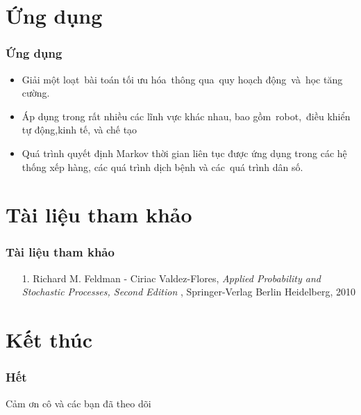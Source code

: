 \documentclass[12pt]{beamer}
\begin{document}
\section{Ứng dụng}
\begin{frame}
	\frametitle{Ứng dụng}
	\begin{itemize}
	\item
	Giải một loạt bài toán tối ưu hóa thông qua quy hoạch động và học tăng cường.
	\item
	Áp dụng trong rất nhiều các lĩnh vực khác nhau, bao gồm robot, điều khiển tự động,kinh tế, và chế tạo
	\item
	Quá trình quyết định Markov thời gian liên tục được ứng dụng trong các hệ thống xếp hàng, các quá trình dịch bệnh và các quá trình dân số.
	\end{itemize}
\end{frame}

\section*{Tài liệu tham khảo}
\begin{frame}
	\frametitle{Tài liệu tham khảo}
   \begin{itemize}
   	\item[1.] Richard M. Feldman - Ciriac Valdez-Flores, \textit{Applied Probability and Stochastic Processes, Second Edition} , Springer-Verlag Berlin Heidelberg, 2010
	\end{itemize}
\end{frame}



\section*{Kết thúc}
\begin{frame}
\frametitle{Hết}
\center
\huge
\color{red}
 Cảm ơn cô và các bạn đã theo dõi
\end{frame}
\end{document}
